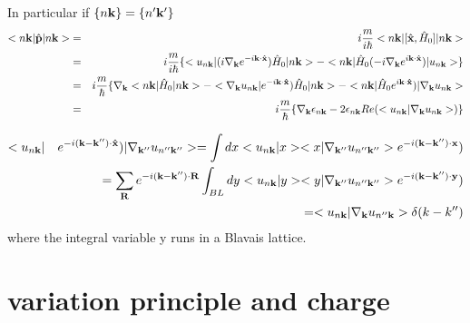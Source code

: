 \documentclass[aps,prb,preprint]{revtex4-1}
\begin{document}
\begin{appendix}
In particular if $\{n{\bf k}\}=\{n'{\bf k'}\}$ 
\begin{eqnarray}
<n{\bf k}|\hat{\bf p}|n{\bf k}> &=& i\frac{m}{i \hbar} <n{\bf k}|[\hat{\bf x},\hat{H}_0]|n{\bf k}> \nonumber \\
&=& i\frac{m}{i \hbar} \{ <u_{n{\bf k}}| (i \nabla_{\bf k} e^{-i{\bf k \cdot \hat{x} }} ) \hat{H}_0 |n{\bf k}> - <n{\bf k}| \hat{H}_0 (-i\nabla_{\bf k} e^{i{\bf k \cdot \hat{x}} }) |u_{n{\bf k}}> \} \nonumber \\
&=& i\frac{m}{\hbar} \{  \nabla_{\bf k} <n{\bf k}|\hat{H}_0|n{\bf k}> - <\nabla_{\bf k} u_{n{\bf k}}| e^{-i{\bf k \cdot \hat{x}} }) \hat{H}_0  |n{\bf k}> - <n{\bf k}| \hat{H}_0 e^{i{\bf k \cdot \hat{x}} })|\nabla_{\bf k} u_{n{\bf k}}> \nonumber \\
&=& i\frac{m}{\hbar} \{  \nabla_{\bf k} \epsilon_{n{\bf k}} - 2 \epsilon_{n{\bf k}} Re( <u_{n{\bf k}}|\nabla_{\bf k}  u_{n{\bf k}}> ) 
\} \nonumber \\
\end{eqnarray} 

\begin{eqnarray}
<u_{n{\bf k}}|&& e^{-i{\bf (k-k'' )\cdot \hat{x}} }) |\nabla_{\bf k''} u_{n''{\bf k''}}> = \int dx <u_{n{\bf k}}|x> <x|\nabla_{\bf k''} u_{n''{\bf k''}}> e^{-i{\bf (k-k'' )\cdot {x}} }) \nonumber \\
&&= \sum_{\bf R} e^{-i{\bf (k-k'' )\cdot {\bf R}} } \int_{BL} dy <u_{n{\bf k}}|y> <y|\nabla_{\bf k''} u_{n''{\bf k''}}> e^{-i{\bf (k-k'' )\cdot {y}} }) \nonumber \\
&&= <u_{n{\bf k}}| \nabla_{\bf k} u_{n''{\bf k}}> \delta(k-k'') 
\end{eqnarray} 
where the integral variable y runs in a Blavais lattice.

\section{variation principle and charge}


\end{appendix}
\end{document}
